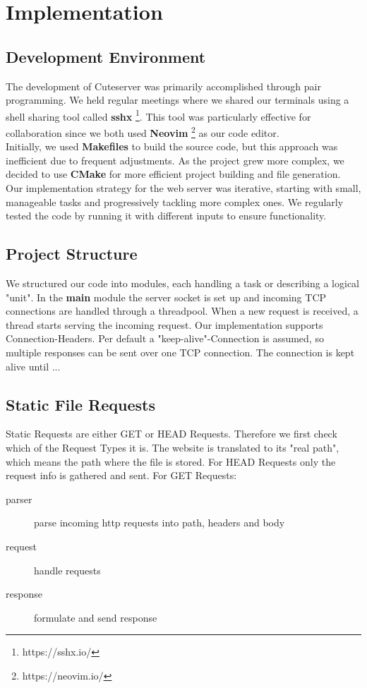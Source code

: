 \section*{Implementation}

\subsection*{Development Environment} 
The development of Cuteserver was primarily accomplished through pair programming. We held regular meetings where we shared our terminals using a shell sharing tool called \textbf{sshx} \footnote{https://sshx.io/}. This tool was particularly effective for collaboration since we both used \textbf{Neovim} \footnote{https://neovim.io/} as our code editor. \\

Initially, we used \textbf{Makefiles} to build the source code, but this approach was inefficient due to frequent adjustments. As the project grew more complex, we decided to use \textbf{CMake} for more efficient project building and file generation. \\

Our implementation strategy for the web server was iterative, starting with small, manageable tasks and progressively tackling more complex ones. We regularly tested the code by running it with different inputs to ensure functionality. %

\subsection*{Project Structure} 
We structured our code into modules, each handling a task or describing a logical "unit". In the \textbf{main} module the server socket is set up and incoming TCP connections are handled through a threadpool. When a new request is received, a thread starts serving the incoming request. Our implementation supports Connection-Headers. Per default a "keep-alive"-Connection is assumed, so multiple responses can be sent over one TCP connection. The connection is kept alive until ... 

\subsection*{Static File Requests}
Static Requests are either GET or HEAD Requests. Therefore we first check which of the Request Types it is. The website is translated to its "real path", which means the path where the file is stored. For HEAD Requests only the request info is gathered and sent. For GET Requests: 
\begin{description}
    \item[parser]parse incoming http requests into path, headers and body
    \item[request]handle requests
    \item[response]formulate and send response
\end{description}

